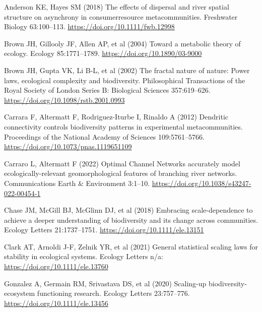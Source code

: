 \documentclass[
  12pt,
]{article}
\newlength{\cslhangindent}
\newlength{\cslentryspacingunit} %
\newenvironment{CSLReferences}[2] %
 {%
  \setlength{\parindent}{0pt}
  \ifodd #1
  \let\oldpar\par
  \def\par{\hangindent=\cslhangindent\oldpar}
  \fi
  \setlength{\parskip}{#2\cslentryspacingunit}
 }%
 {}
\begin{document}
\hypertarget{refs}{}
\begin{CSLReferences}{1}{0}
\leavevmode{}%
Anderson KE, Hayes SM (2018) The effects of dispersal and river spatial structure on asynchrony in consumer\textendash resource metacommunities. Freshwater Biology 63:100--113. \url{https://doi.org/10.1111/fwb.12998}

\leavevmode{}%
Brown JH, Gillooly JF, Allen AP, et al (2004) Toward a metabolic theory of ecology. Ecology 85:1771--1789. \url{https://doi.org/10.1890/03-9000}

\leavevmode{}%
Brown JH, Gupta VK, Li B-L, et al (2002) The fractal nature of nature: Power laws, ecological complexity and biodiversity. Philosophical Transactions of the Royal Society of London Series B: Biological Sciences 357:619--626. \url{https://doi.org/10.1098/rstb.2001.0993}

\leavevmode{}%
Carrara F, Altermatt F, Rodriguez-Iturbe I, Rinaldo A (2012) Dendritic connectivity controls biodiversity patterns in experimental metacommunities. Proceedings of the National Academy of Sciences 109:5761--5766. \url{https://doi.org/10.1073/pnas.1119651109}

\leavevmode{}%
Carraro L, Altermatt F (2022) Optimal {Channel Networks} accurately model ecologically-relevant geomorphological features of branching river networks. Communications Earth \& Environment 3:1--10. \url{https://doi.org/10.1038/s43247-022-00454-1}

\leavevmode{}%
Chase JM, McGill BJ, McGlinn DJ, et al (2018) Embracing scale-dependence to achieve a deeper understanding of biodiversity and its change across communities. Ecology Letters 21:1737--1751. \url{https://doi.org/10.1111/ele.13151}

\leavevmode{}%
Clark AT, Arnoldi J-F, Zelnik YR, et al (2021) General statistical scaling laws for stability in ecological systems. Ecology Letters n/a: \url{https://doi.org/10.1111/ele.13760}

\leavevmode{}%
Gonzalez A, Germain RM, Srivastava DS, et al (2020) Scaling-up biodiversity-ecosystem functioning research. Ecology Letters 23:757--776. \url{https://doi.org/10.1111/ele.13456}


\end{CSLReferences}
\end{document}
